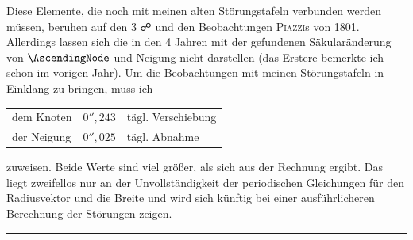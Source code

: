 Diese Elemente, die noch mit meinen alten Störungstafeln verbunden werden müssen, beruhen auf den 3 {\AstroSymbols ☍} und den Beobachtungen \textsc{Piazzi}s von 1801. Allerdings lassen sich die  in den 4 Jahren mit der gefundenen Säkularänderung von \(\AscendingNode\) und Neigung nicht darstellen (das Erstere bemerkte ich schon im vorigen Jahr). Um die Beobachtungen mit meinen Störungstafeln in Einklang zu bringen, muss ich
\begin{center}
\begin{tabular}{l l l}
dem Knoten & \(0''{,}243\) & tägl. Verschiebung\\
der Neigung & \(0''{,}025\) & tägl. Abnahme
\end{tabular}
\end{center}
zuweisen. Beide Werte sind viel größer, als sich aus der Rechnung ergibt. Das liegt zweifellos nur an der Unvollständigkeit der periodischen Gleichungen für den Radiusvektor und die Breite und wird sich künftig bei einer ausführlicheren Berechnung der Störungen zeigen.
\par\medskip\begin{center}\rule{.22\linewidth}{.4pt}\end{center}

